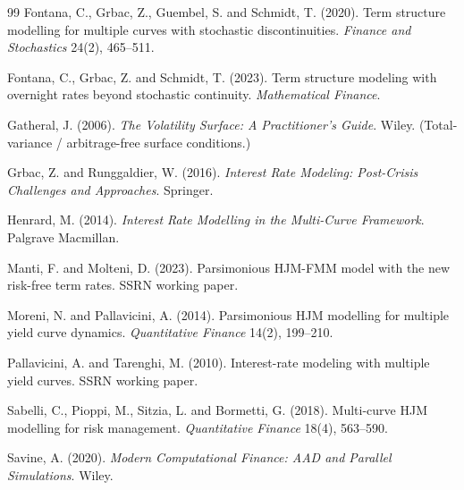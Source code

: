 \documentclass[11pt]{article}
\theoremstyle{plain}
\theoremstyle{definition}
\begin{document}
\begin{thebibliography}{99}
Fontana, C., Grbac, Z., Guembel, S. and Schmidt, T. (2020). Term structure
modelling for multiple curves with stochastic discontinuities.
\emph{Finance and Stochastics} 24(2), 465--511.

Fontana, C., Grbac, Z. and Schmidt, T. (2023). Term structure modeling with
overnight rates beyond stochastic continuity. \emph{Mathematical Finance}.

Gatheral, J. (2006). \emph{The Volatility Surface: A Practitioner's Guide}.
Wiley. (Total-variance / arbitrage-free surface conditions.)

Grbac, Z. and Runggaldier, W. (2016). \emph{Interest Rate Modeling: Post-Crisis
Challenges and Approaches}. Springer.

Henrard, M. (2014). \emph{Interest Rate Modelling in the Multi-Curve Framework}.
Palgrave Macmillan.

Manti, F. and Molteni, D. (2023). Parsimonious HJM-FMM model with the new
risk-free term rates. SSRN working paper.

Moreni, N. and Pallavicini, A. (2014). Parsimonious HJM modelling for multiple
yield curve dynamics. \emph{Quantitative Finance} 14(2), 199--210.

Pallavicini, A. and Tarenghi, M. (2010). Interest-rate modeling with multiple
yield curves. SSRN working paper.

Sabelli, C., Pioppi, M., Sitzia, L. and Bormetti, G. (2018). Multi-curve HJM
modelling for risk management. \emph{Quantitative Finance} 18(4), 563--590.

Savine, A. (2020). \emph{Modern Computational Finance: AAD and Parallel
Simulations}. Wiley.

\end{thebibliography}
\end{document}
